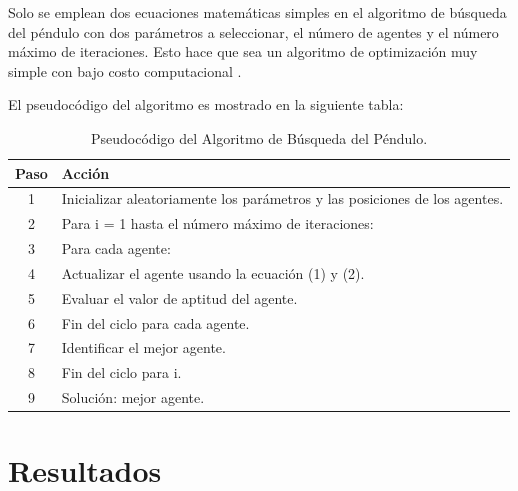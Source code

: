 \documentclass[conference]{IEEEtran}
\begin{document}
Solo se emplean dos ecuaciones matemáticas simples en el algoritmo de búsqueda
del péndulo con dos parámetros a seleccionar, el número de agentes y el número
máximo de iteraciones. Esto hace que sea un algoritmo de optimización muy
simple con bajo costo computacional \cite{aziz2022}.

El pseudocódigo del algoritmo es mostrado en la siguiente tabla:

\renewcommand{\tablename}{Tabla}
\begin{table}[h]
    \centering
    \begin{tabular}{|c|l|}
        \hline
        \textbf{Paso} & \textbf{Acción}
        \\
        \hline
        1             & Inicializar aleatoriamente los parámetros y las
        posiciones de los agentes.                                           \\
        2             & Para i = 1 hasta el número máximo de iteraciones:
        \\
        3             & \hspace{1em} Para cada agente:
        \\
        4             & \hspace{2em} Actualizar el agente usando la ecuación
        (1) y (2).                                                           \\
        5             & \hspace{2em} Evaluar el valor de aptitud del agente.
        \\
        6             & \hspace{1em} Fin del ciclo para cada agente.
        \\
        7             & \hspace{1em} Identificar el mejor agente.
        \\
        8             & Fin del ciclo para i.
        \\
        9             & Solución: mejor agente.
        \\
        \hline
    \end{tabular}
    \caption{Pseudocódigo del Algoritmo de Búsqueda del Péndulo.}
    \label{table:pendulumSearchAlgorithm}
\end{table}

\section{Resultados}
\label{sec:Res}
\end{document}

